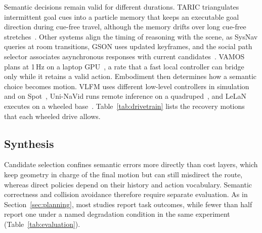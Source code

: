Semantic decisions remain valid for different durations. TARIC triangulates intermittent goal cues into a particle memory that keeps an executable goal direction during cue-free travel, although the memory drifts over long cue-free stretches~\cite{P_E42}. Other systems align the timing of reasoning with the scene, as SysNav queries at room transitions, GSON uses updated keyframes, and the social path selector associates asynchronous responses with current candidates~\cite{P_E41,P_F06,P_E43}. VAMOS plans at 1\,Hz on a laptop GPU~\cite{P_R26}, a rate that a fast local controller can bridge only while it retains a valid action. Embodiment then determines how a semantic choice becomes motion. VLFM uses different low-level controllers in simulation and on Spot~\cite{P_E47}, Uni-NaVid runs remote inference on a quadruped~\cite{P_E49}, and LeLaN executes on a wheeled base~\cite{P_E50}. Table~\ref{tab:drivetrain} lists the recovery motions that each wheeled drive allows.

\subsection{Synthesis}
\label{sec:semantic-synthesis}

Candidate selection confines semantic errors more directly than cost layers, which keep geometry in charge of the final motion but can still misdirect the route, whereas direct policies depend on their history and action vocabulary. Semantic correctness and collision avoidance therefore require separate evaluation. As in Section~\ref{sec:planning}, most studies report task outcomes, while fewer than half report one under a named degradation condition in the same experiment (Table~\ref{tab:evaluation}).
